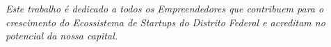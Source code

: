 \begin{dedicatoria}
   \vspace*{\fill}
   \centering
   \noindent
   \textit{Este trabalho é dedicado a todos os Empreendedores que contribuem para o crescimento do Ecossistema de Startups do Distrito Federal e acreditam no potencial da nossa capital.} \vspace*{\fill}
\end{dedicatoria}
